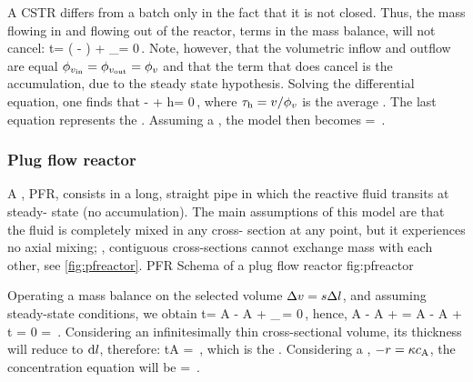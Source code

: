 A CSTR differs from a batch only in the fact that it is not closed. Thus, the mass flowing in and flowing out of the reactor, terms in the mass balance, will not cancel:
\beq
\iod t\mass = \flow\vol\left( - \right) + \int_\vol\rrate\dx\vol = 0\,.
\eeq
Note, however, that the volumetric inflow and outflow are equal $\phi_{v_\text{in}} = \phi_{v_\text{out}} = \phi_{v}$ and that the term that does cancel is the accumulation, due to the steady state hypothesis. Solving the differential equation, one finds that
\beq
{} -  + \rtime\txt h\rrate = 0\,,
\eeq
where $\tau_\text{h} = v/\phi_{v}$ is the average . The last equation represents the . Assuming a , the model then becomes
\beq
{} = \,.
\eeq


\subsubsection{Plug flow reactor}
A , PFR, consists in a long, straight pipe in which the reactive fluid transits at steady- state (no accumulation). The main assumptions of this model are that the fluid is completely mixed in any cross- section at any point, but it experiences no axial mixing; \ie, contiguous cross-sections cannot exchange mass with each other, see \cref{fig:pfreactor}.
%
   {PFR}
   {Schema of a plug flow reactor}%
   {fig:pfreactor}%

Operating a mass balance on the selected volume $\Delta v = s\Delta l$, and assuming steady-state conditions, we obtain
\beq
\iod t\mass = \flow\vol\conc A - \flow\vol\conc A + \int_{\Dx\vol}\rrate\,\dx\vol = 0\,,
\eeq
hence,
\beq
\flow\vol\conc A - \flow\vol\conc A + \rrate\Dx\vol = 
\flow\vol\conc A - \flow\vol\conc A + \rrate\flow\vol\Dx t = 0
\implies
{} = \rrate\,.
\eeq
Considering an infinitesimally thin cross-sectional volume, its thickness will reduce to $\text{d}l$, therefore:
\beq
\iod t\conc A = \rrate\,,
\eeq
which is the . Considering a , $-\rrate = \krcoeff\conc A$, the concentration equation will be
\beq
{} = \exp{}\,.
\eeq


